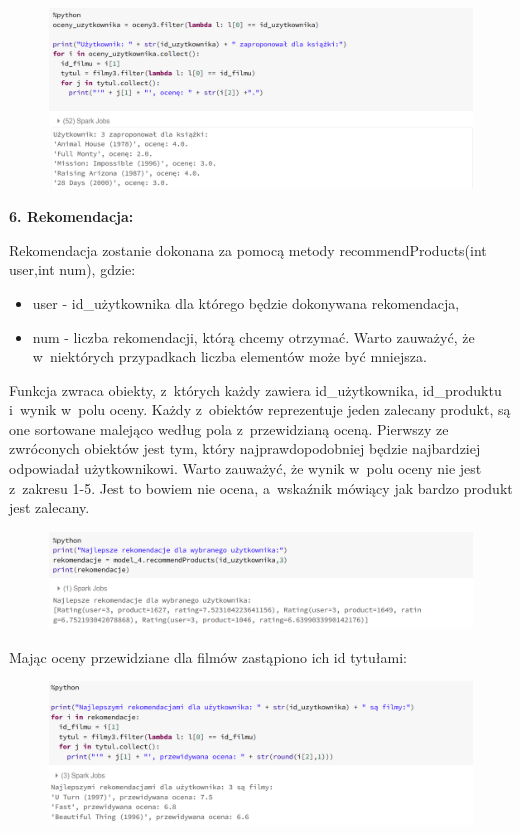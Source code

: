 \documentclass[12pt,a4paper]{report}
\begin{document}
\begin{figure}[H]
\includegraphics[scale=0.5]{obrazy/ALS16.PNG} 
\end{figure}

\textbf{6. Rekomendacja:}

Rekomendacja zostanie dokonana za pomocą metody recommendProducts(int user,int num), gdzie:
\begin{itemize}
\item user - id\_użytkownika dla którego będzie dokonywana rekomendacja,
\item num - liczba rekomendacji, którą chcemy otrzymać. Warto zauważyć, że w~niektórych przypadkach liczba elementów może być mniejsza.
\end{itemize}

Funkcja zwraca obiekty, z~których każdy zawiera id\_użytkownika, id\_produktu i~wynik w~polu oceny. Każdy z~obiektów reprezentuje jeden zalecany produkt, są one sortowane malejąco według pola z~przewidzianą oceną. Pierwszy ze zwróconych obiektów jest tym, który najprawdopodobniej będzie najbardziej odpowiadał użytkownikowi. Warto zauważyć, że wynik w~polu oceny nie jest z~zakresu 1-5. Jest to bowiem nie ocena, a~wskaźnik mówiący jak bardzo produkt jest zalecany.

\begin{figure}[H]
\includegraphics[scale=0.5]{obrazy/ALS17.PNG} 
\end{figure}

Mając oceny przewidziane dla filmów zastąpiono ich id tytułami:

\begin{figure}[H]
\includegraphics[scale=0.5]{obrazy/ALS18.PNG} 
\end{figure}
\end{document}
